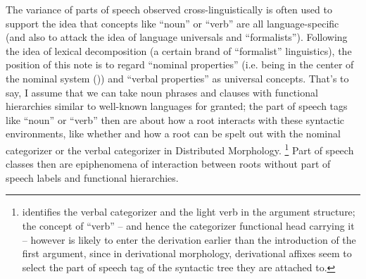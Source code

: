 \documentclass[UTF8, a4paper, oneside, scheme=plain, 12pt]{ctexbook}
\newcommand*{\citechap}[1]{Ch.~{#1}}
\begin{document}
{The variance of parts of speech observed cross-linguistically
is often used to support the idea that 
concepts like ``noun'' or ``verb'' 
are all language-specific
(and also to attack the idea of language universals and ``formalists'').
Following the idea of lexical decomposition (a certain brand of ``formalist'' linguistics),
the position of this note is to regard ``nominal properties''
(i.e. being in the center of the nominal system ())
and ``verbal properties''
as universal concepts.
That's to say, I assume that we can take noun phrases and clauses
with functional hierarchies similar to well-known languages 
for granted;
the part of speech tags like ``noun'' or ``verb''
then are about how a root interacts with these syntactic environments,
like whether and how a root can be spelt out 
with the nominal categorizer or the verbal categorizer in Distributed Morphology.%
\footnote{
    \citet[\citechap{10}]{siddiqi2009syntax} identifies 
    the verbal categorizer and the light verb in the argument structure; 
    the concept of ``verb'' -- and hence the categorizer functional head carrying it --  
    however is likely to enter the derivation 
    earlier than the introduction of the first argument, 
    since in derivational morphology, 
    derivational affixes seem to select the part of speech tag 
    of the syntactic tree they are attached to.
}
Part of speech classes then are epiphenomena 
of interaction between roots without part of speech labels  
and functional hierarchies.

}
\end{document}

